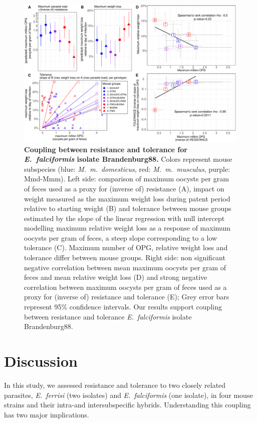 \begin{figure}[H]
    \centering
    \includegraphics[width=\linewidth,height=\textheight,keepaspectratio]{images/3article2/Fig5_final.pdf}
    \caption{\textbf{Coupling between resistance and tolerance for \textit{E.~falciformis} isolate Brandenburg88.} Colors represent mouse subspecies (blue: \textit{M.~m.~domesticus}, red: \textit{M.~m.~musculus}, purple: Mmd-Mmm). Left side: comparison of maximum oocysts per gram of feces used as a proxy for (inverse of) resistance (A), impact on weight measured as the maximum weight loss during patent period relative to starting weight (B) and tolerance between mouse groups estimated by the slope of the linear regression with null intercept modelling maximum relative weight loss as a response of maximum oocysts per gram of feces, a steep slope corresponding to a low tolerance (C). Maximum number of OPG, relative weight loss and tolerance differ between mouse groups. Right side: non significant negative correlation between mean maximum oocysts per gram of feces and mean relative weight loss (D) and strong negative correlation between maximum oocysts per gram of feces used as a proxy for (inverse of) resistance and tolerance (E); Grey error bars represent 95\% confidence intervals. Our results support coupling between resistance and tolerance \textit{E.~falciformis} isolate Brandenburg88.}
\end{figure}

\section{Discussion}

In this study, we assessed resistance and tolerance to two closely related parasites, \textit{E.~ferrisi} (two isolates) and \textit{E.~falciformis} (one isolate), in four mouse strains and their intra-and intersubspecific hybrids. Understanding this coupling has two major implications. \par

